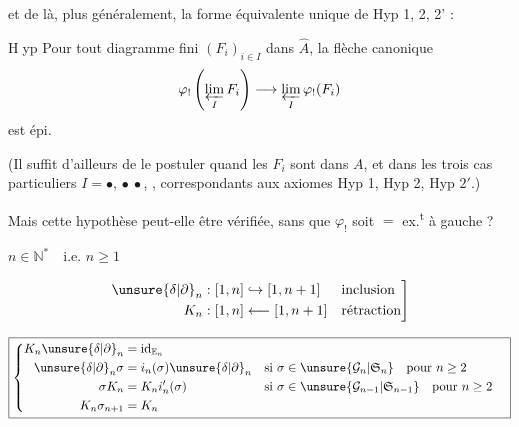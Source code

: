 et de là, plus généralement, la forme équivalente unique de Hyp 1, 2, 2' :

\textcircled{Hyp}
Pour tout diagramme fini $(F_i)_{i\in I}$ dans $\widehat A$, la flèche canonique
\[
\varphi_!\left(\varprojlim_I F_i\right)\longrightarrow\varprojlim_I\varphi_!(F_i)
\]
est épi.

(Il suffit d'ailleurs de le postuler quand les $F_i$ sont dans $A$, et dans les trois cas particuliers $I=\bullet$, $\bullet\ \bullet$,
\diagram{\begin{tikzcd}[ampersand replacement=\&,column sep=tiny,row sep=tiny]
\bullet\arrow[dr]\&\&\bullet\arrow[dl]\\
\&\bullet\&
\end{tikzcd}}, correspondants aux axiomes Hyp 1, Hyp 2, Hyp $2'$.)

Mais cette hypothèse peut-elle être vérifiée, sans que $\varphi_!$ soit $=$ ex.\textsuperscript{t} à gauche ?



$n\in\mathbb N^*\quad\text{i.e. }n\geq1$

\[
\left.\begin{aligned}
{\unsure{\delta|\partial}}_n &: [1,n]\hookrightarrow[1,n+1]&&\text{inclusion}\\
K_n &: [1,n]\longleftarrow[1,n+1]&&\text{rétraction}
\end{aligned}\right]
\]

\[
\boxed{\left\{\begin{aligned}
K_n{\unsure{\delta|\partial}}_n&=\mathrm{id}_{\mathbb E_n}\\
{\unsure{\delta|\partial}}_n\sigma&=i_n(\sigma){\unsure{\delta|\partial}}_n&&\text{si }\sigma\in\unsure{\mathcal G_n|\mathfrak S_n}\quad\text{pour }n\geq2\\
\sigma K_n&=K_n i'_n(\sigma)&&\text{si }\sigma\in\unsure{\mathcal G_{n-1}|\mathfrak S_{n-1}}\quad\text{pour }n\geq2\\
K_n\sigma_{n+1}&=K_n
\end{aligned}\right.}
\]
\margin{où $\sigma_m\in\unsure{\mathcal G_m|\mathfrak S_m}$ est la transposition $[m-1,m)$}

